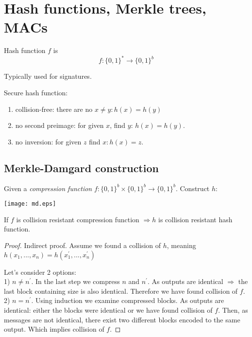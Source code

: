 \section{\texorpdfstring{Hash functions, Merkle trees, MACs}{Hash functions, Merkle trees, MACs}}
\vspace{5mm}
\large

\begin{definition}
	Hash function $f$ is
	\[ f:\{0, 1\}^{\ast} \to \{ 0,1 \}^b \]

	Typically used for signatures.
\end{definition}

\begin{properties} Secure hash function:
	\begin{enumerate}
		\item collision-free: there are no $x \neq y: h(x) = h(y)$
		\item no second preimage: for given $x$, find $y$: $h(x) = h(y)$.
		\item no inversion: for given $z$ find $x: h(x) = z$.
	\end{enumerate}

\end{properties}

\subsection{Merkle-Damgard construction}
Given a \emph{compression function} $f:\{0, 1 \}^b \times \{0, 1 \}^b \to \{0, 1 \}^b$. Construct $h$:

	\texttt{[image: md.eps]}

\begin{theorem}
	If $f$ is collision resistant compression function $\Rightarrow h$ is collision resistant hash function.
\end{theorem}
\begin{proof}
	Indirect proof. Assume we found a collision of $h$, meaning $h(x_1,...,x_n) = h(x_1^{\prime},...,x_n^{\prime})$

	Let's consider 2 options:\\
	1) $n \neq n^{\prime}$. In the last step we compress $n$ and $n^{\prime}$. As outputs are identical $\Rightarrow$ the last block containing size is also identical. Therefore we have found collision of $f$.\\
	2) $n = n^{\prime}$. Using induction we examine compressed blocks. As outputs are identical: either the blocks were identical or we have found collision of $f$. Then, as messages are not identical, there exist two different blocks encoded to the same output. Which implies collision of $f$.
\end{proof}

